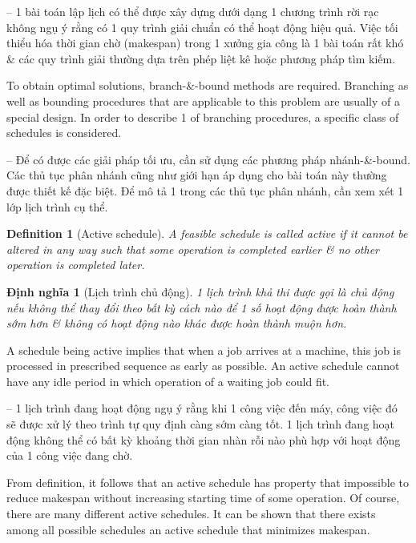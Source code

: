 \documentclass{article}
\newtheorem{definition}{Definition}
\newtheorem{dinhnghia}{Định nghĩa}
\begin{document}
\begin{itemize}
\begin{itemize}
        -- 1 bài toán lập lịch có thể được xây dựng dưới dạng 1 chương trình rời rạc không ngụ ý rằng có 1 quy trình giải chuẩn có thể hoạt động hiệu quả. Việc tối thiểu hóa thời gian chờ (makespan) trong 1 xưởng gia công là 1 bài toán rất khó \& các quy trình giải thường dựa trên phép liệt kê hoặc phương pháp tìm kiếm.

        To obtain optimal solutions, branch-\&-bound methods are required. Branching as well as bounding procedures that are applicable to this problem are usually of a special design. In order to describe 1 of branching procedures, a specific class of schedules is considered.

        -- Để có được các giải pháp tối ưu, cần sử dụng các phương pháp nhánh-\&-bound. Các thủ tục phân nhánh cũng như giới hạn áp dụng cho bài toán này thường được thiết kế đặc biệt. Để mô tả 1 trong các thủ tục phân nhánh, cần xem xét 1 lớp lịch trình cụ thể.

        \begin{definition}[Active schedule]
            A feasible schedule is called {\rm active} if it cannot be altered in any way such that some operation is completed earlier \& no other operation is completed later.
        \end{definition}

        \begin{dinhnghia}[Lịch trình chủ động]
            1 lịch trình khả thi được gọi là chủ động nếu không thể thay đổi theo bất kỳ cách nào để 1 số hoạt động được hoàn thành sớm hơn \& không có hoạt động nào khác được hoàn thành muộn hơn.
        \end{dinhnghia}
        A schedule being active implies that when a job arrives at a machine, this job is processed in prescribed sequence as early as possible. An active schedule cannot have any idle period in which operation of a waiting job could fit.

        -- 1 lịch trình đang hoạt động ngụ ý rằng khi 1 công việc đến máy, công việc đó sẽ được xử lý theo trình tự quy định càng sớm càng tốt. 1 lịch trình đang hoạt động không thể có bất kỳ khoảng thời gian nhàn rỗi nào phù hợp với hoạt động của 1 công việc đang chờ.

        From definition, it follows that an active schedule has property that impossible to reduce makespan without increasing starting time of some operation. Of course, there are many different active schedules. It can be shown that there exists among all possible schedules an active schedule that minimizes makespan.


\end{itemize}
\end{itemize}
\end{document}
